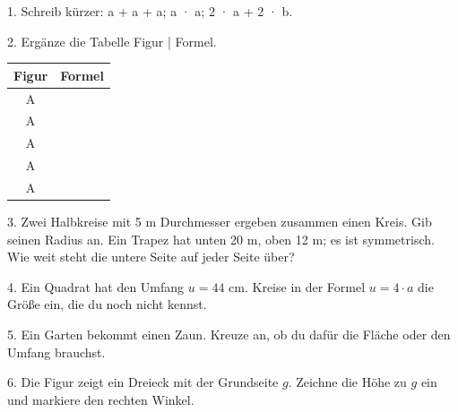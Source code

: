 \documentclass[11pt]{article}
\begin{document}
\pfheftstil
{}
\pfrueckblick
\begin{pfaufg}{}{1.}{}
Schreib kürzer: a + a + a; a · a; 2 · a + 2 · b.
\end{pfaufg}
\begin{pfaufg}{}{2.}{}
Ergänze die Tabelle Figur | Formel.
\par\smallskip\noindent \begingroup\renewcommand{\arraystretch}{1.3}\begin{tabular}{|c|c|}\hline \textbf{Figur} & \textbf{Formel} \\ \hline A & \rule{0pt}{3ex}\hspace{1.6cm} \\ \hline A & \rule{0pt}{3ex}\hspace{1.6cm} \\ \hline A & \rule{0pt}{3ex}\hspace{1.6cm} \\ \hline A & \rule{0pt}{3ex}\hspace{1.6cm} \\ \hline A & \rule{0pt}{3ex}\hspace{1.6cm} \\ \hline\end{tabular}\endgroup\par
{}
\end{pfaufg}
\begin{pfaufg}{}{3.}{}
Zwei Halbkreise mit 5 m Durchmesser ergeben zusammen einen Kreis. Gib seinen Radius an. Ein Trapez hat unten 20 m, oben 12 m; es ist symmetrisch. Wie weit steht die untere Seite auf jeder Seite über?
\end{pfaufg}
\pfgruppe{}
\begin{pfaufg}{}{4.}{}
Ein Quadrat hat den Umfang $u = 44$ cm. Kreise in der Formel $u = 4 \cdot a$ die Größe ein, die du noch nicht kennst.
\end{pfaufg}
\begin{pfaufg}{}{5.}{}
Ein Garten bekommt einen Zaun. Kreuze an, ob du dafür die Fläche oder den Umfang brauchst. 
\end{pfaufg}
\begin{pfaufg}{}{6.}{}
Die Figur zeigt ein Dreieck mit der Grundseite $g$. Zeichne die Höhe zu $g$ ein und markiere den rechten Winkel.
\par\smallskip\noindent {}\par
{}
\end{pfaufg}
\end{document}
